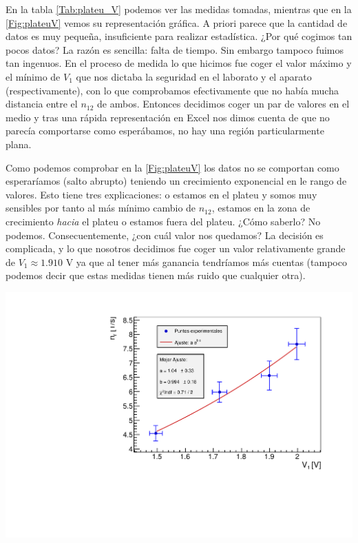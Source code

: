 \documentclass[11pt]{article}
\begin{document}
En la tabla \ref{Tab:plateu_V} podemos ver las medidas tomadas, mientras que en la \cref{Fig:plateuV} vemos su representación gráfica. A priori parece que la cantidad de datos es muy pequeña, insuficiente para realizar estadística. ¿Por qué cogimos tan pocos datos? La razón es sencilla: falta de tiempo. Sin embargo tampoco fuimos tan ingenuos. En el proceso de medida lo que hicimos fue coger el valor máximo  y el mínimo de $V_1$ que nos dictaba la seguridad en el laborato y el aparato (respectivamente), con lo que comprobamos efectivamente que no había mucha distancia entre el $n_{12}$ de ambos. Entonces decidimos coger un par de valores en el medio y tras una rápida representación en Excel nos dimos cuenta de que no parecía comportarse como esperábamos, no hay una región particularmente plana. 


\begin{minipage}[t]{0.4\linewidth}
	\begingroup
	\setlength{\parskip}{2.2mm} %
	Como podemos comprobar en la \cref{Fig:plateuV} los datos no se comportan como esperaríamos (salto abrupto) teniendo un crecimiento exponencial en le rango de valores. Esto tiene tres explicaciones: o estamos en el plateu y somos muy sensibles por tanto al más mínimo cambio de $n_{12}$, estamos en la zona de crecimiento \textit{hacia} el plateu o estamos fuera del plateu. ¿Cómo saberlo? No podemos. Consecuentemente, ¿con cuál valor nos quedamos? La decisión es complicada, y lo que nosotros decidimos fue coger un valor relativamente grande de $V_1\approx 1.910$ V ya que al tener más ganancia tendríamos más cuentas (tampoco podemos decir que estas medidas tienen más ruido que cualquier otra). 
	\endgroup
\end{minipage}
\hfill
\begin{minipage}[t]{0.63\linewidth}
	\begin{center}
		\label{Fig:plateuV}
		\vspace{-1.0em}
		\includegraphics[width=0.95\linewidth]{../Graficas/GraficoV.pdf}
	\end{center}
\end{minipage}
\end{document}
